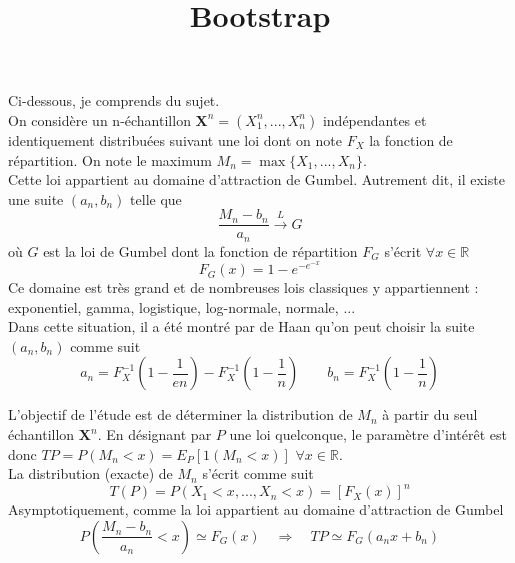 \documentclass{article}
\title{Bootstrap}
\begin{document}
\maketitle

\noindent Ci-dessous, je comprends du sujet.\\

\noindent On considère un n-échantillon $\boldsymbol{X}^n = (X^n_1, ..., X^n_n)$ indépendantes et identiquement distribuées suivant une loi dont on note $F_X$ la fonction de répartition. On note le maximum $M_n = \max \{X_1, ..., X_n\}$.\\

\noindent Cette loi appartient au domaine d'attraction de Gumbel. Autrement dit, il existe une suite $(a_n,b_n)$ telle que 
\begin{equation}
\frac{M_n - b_n}{a_n} \overset{L}{\longrightarrow} G
\end{equation}
où $G$ est la loi de Gumbel dont la fonction de répartition $F_G$ s'écrit $\forall x \in \mathbb{R}$
\begin{equation}
F_G(x) = 1 - e^{-e^{-x}}
\end{equation}
Ce domaine est très grand et de nombreuses lois classiques y appartiennent : exponentiel, gamma, logistique, log-normale, normale, ...\\

\noindent Dans cette situation, il a été montré par de Haan qu'on peut choisir la suite $(a_n, b_n)$ comme suit
\begin{equation}
a_n = F_X^{-1}\left(1-\frac{1}{e n}\right) - F_X^{-1}\left(1- \frac{1}{n}\right) \qquad b_n = F_X^{-1}\left(1- \frac{1}{n}\right)
\end{equation}

\noindent L'objectif de l'étude est de déterminer la distribution de $M_n$ à partir du seul échantillon $\boldsymbol{X}^n$. En désignant par $P$ une loi quelconque, le paramètre d'intérêt est donc $TP = P(M_n < x) = E_P[1(M_n < x)]$ $\forall x \in \mathbb{R}$.\\

\noindent La distribution (exacte) de $M_n$ s'écrit comme suit
\begin{equation}
T(P) = P(X_1 < x, ..., X_n < x) = [F_X(x)]^n
\end{equation}
Asymptotiquement, comme la loi appartient au domaine d'attraction de Gumbel
\begin{equation}
P\left(\frac{M_n - b_n}{a_n} < x\right) \simeq F_G(x) \quad \Longrightarrow \quad TP \simeq F_G(a_n x + b_n)
\end{equation}
\end{document}
